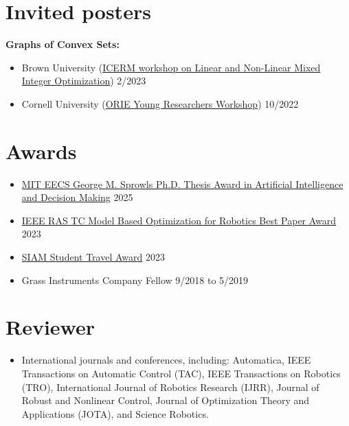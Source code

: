 \documentclass[11pt,a4paper,sans,twoside]{moderncv}
\begin{document}
\section{Invited posters}

\textbf{Graphs of Convex Sets:}

\begin{itemize}

\item
Brown University
(\href{https://icerm.brown.edu/programs/sp-s23/w1/}{\color{cyan}ICERM workshop on Linear and Non-Linear Mixed Integer Optimization})
\hfill 2/2023

\item
Cornell University
(\href{https://www.orie.cornell.edu/orie-events/young-researchers-workshop}{\color{cyan}ORIE Young Researchers Workshop})
\hfill 10/2022

\end{itemize}

\section{Awards}


\begin{itemize}
\item 
\href{https://www.eecs.mit.edu/eecs-2025-awards/}{\color{cyan}MIT EECS George M. Sprowls Ph.D. Thesis Award in Artificial Intelligence and Decision Making} \hfill 2025
\item \href{https://www.tcoptrob.org/news/2024-06-12-best-paper/}{\color{cyan}IEEE RAS TC Model Based Optimization for Robotics Best Paper Award} \hfill 2023
\item  \href{https://www.siam.org/conferences/conference-support/siam-student-travel-awards}{\color{cyan}SIAM Student Travel Award} \hfill 2023
\item Grass Instruments Company Fellow \hfill 9/2018 to 5/2019
\end{itemize}

\section{Reviewer}


\begin{itemize}



\item
International journals and conferences, including:
Automatica,
IEEE Transactions on Automatic Control (TAC),
IEEE Transactions on Robotics (TRO),
International Journal of Robotics Research (IJRR),
Journal of Robust and Nonlinear Control,
Journal of Optimization Theory and Applications (JOTA), and
Science Robotics.

\end{itemize}
\end{document}
